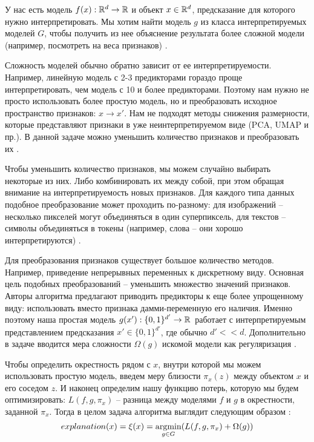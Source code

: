 У нас есть модель $f(x): \mathbb{R}^d \rightarrow \mathbb{R}$ и объект $x \in \mathbb{R}^d$, предсказание для которого нужно интерпретировать. Мы хотим найти модель $g$ из класса интерпретируемых моделей $G$, чтобы получить из нее объяснение результата более сложной модели (например, посмотреть на веса признаков) \cite{lime}.

Сложность моделей обычно обратно зависит от ее интерпретируемости. Например, линейную модель с 2-3 предикторами гораздо проще интерпретировать, чем модель с 10 и более предикторами. Поэтому нам нужно не просто использовать более простую модель, но и преобразовать исходное пространство признаков: $x \rightarrow x'$. Нам не подходят методы снижения размерности, которые представляют признаки в уже неинтерпретируемом виде (PCA, UMAP и пр.). В данной задаче можно уменьшить количество признаков и преобразовать их \cite{lime}.

Чтобы уменьшить количество признаков, мы можем случайно выбирать некоторые из них. Либо комбинировать их между собой, при этом обращая внимание на интерпретируемость новых признаков. Для каждого типа данных подобное преобразование может проходить по-разному: для изображений -- несколько пикселей могут объединяться в один суперпиксель, для текстов -- символы объединяться в токены (например, слова -- они хорошо интерпретируются) \cite{basis}.

Для преобразования признаков существует большое количество методов. Например, приведение непрерывных переменных к дискретному виду. Основная цель подобных преобразований -- уменьшить множество значений признаков. Авторы алгоритма предлагают приводить предикторы к еще более упрощенному виду: использовать вместо признака дамми-переменную его наличия. Именно поэтому наша простая модель $g(x'):\{0,1\}^{d'} \rightarrow \mathbb{R}\,$ работает с интерпретируемым представлением предсказания $x' \in \{0,1\}^{d'}$, где обычно $d' << d$.
Дополнительно в задаче вводится мера сложности $\Omega(g)$ искомой модели как регуляризация \cite{lime_dop}.

Чтобы определить окрестность рядом с $x$, внутри которой мы можем использовать простую модель, введем меру близости $\pi_x(z)$ между объектом $x$ и его соседом $z$. И наконец определим нашу функцию потерь, которую мы будем оптимизировать: $L(f, g, \pi_x)$ -- разница между моделями $f$ и $g$ в окрестности, заданной $\pi_x$. Тогда в целом задача алгоритма выглядит следующим образом \cite{lime}:
\[
explanation(x) = \xi(x) = \underset{g \in G}{\operatorname{argmin}} (L(f, g, \pi_x) + \Omega(g))
\]


